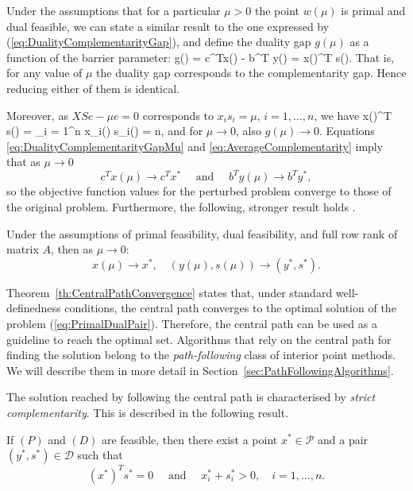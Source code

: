 
Under the assumptions that for a particular $\mu > 0$ the point
$w(\mu)$ is primal and dual feasible, we can state
a similar result to the one expressed by 
(\ref{eq:DualityComplementarityGap}), and define the duality gap
$g(\mu)$ as a function of the barrier parameter:
\be  \label{eq:DualityComplementarityGapMu}
  g(\mu) = c^Tx(\mu) - b^T y(\mu) = x(\mu)^T s(\mu).
\ee
That is, for any value of $\mu$
the duality gap corresponds to the complementarity gap.
Hence reducing either of them is identical.

Moreover, as $XSe - \mu e = 0$ corresponds to $x_is_i = \mu$, $i=1,\ldots,n$,
we have
\be  \label{eq:AverageComplementarity}
   x(\mu)^T s(\mu) = \sum_{i = 1}^n x_i(\mu) s_i(\mu) = n\mu,
\ee
and for $\mu \to 0$, also $g(\mu) \to 0$.
Equations \eqref{eq:DualityComplementarityGapMu} and
\eqref{eq:AverageComplementarity} imply that as $\mu\to 0$
\[
   c^Tx(\mu)\to c^Tx^* \quad \text{ and } \quad b^Ty(\mu) \to b^Ty^*,
\]
so the objective function values for the perturbed
problem converge to those of the original problem.
Furthermore, the following, stronger result holds \cite{Megiddo}.
%
\begin{theorem}
\label{th:CentralPathConvergence}
Under the assumptions of primal feasibility, dual feasibility, and
full row rank of matrix $A$, then as $\mu \to 0:$
\[
   x(\mu) \to x^*, \quad (y(\mu),s(\mu)) \to (y^*, s^*).
\]
\end{theorem}

Theorem~\ref{th:CentralPathConvergence} states that, under standard
well-definedness conditions, the central path converges to 
the optimal solution of the problem (\ref{eq:PrimalDualPair}).
Therefore, the central path can be used as a guideline to
reach the optimal set.
Algorithms that rely on the central path for finding the solution
belong to the {\em path-following} class of interior point methods.
We will describe them in more detail
in Section~\ref{sec:PathFollowingAlgorithms}.

The solution reached by following the central path is 
characterised by {\em strict complementarity}. 
This is described in the following result.

\begin{theorem}
If $(P)$ and $(D)$ are feasible, then there exist a point $x^* \in\mathcal{P}$
and a pair $(y^*,s^*) \in \mathcal{D}$ such that
\[
(x^*)^T s^* = 0 \quad\mbox{ and }\quad x^*_i + s_i^* >0, \quad i = 1,\ldots,n.
\]
\end{theorem}

